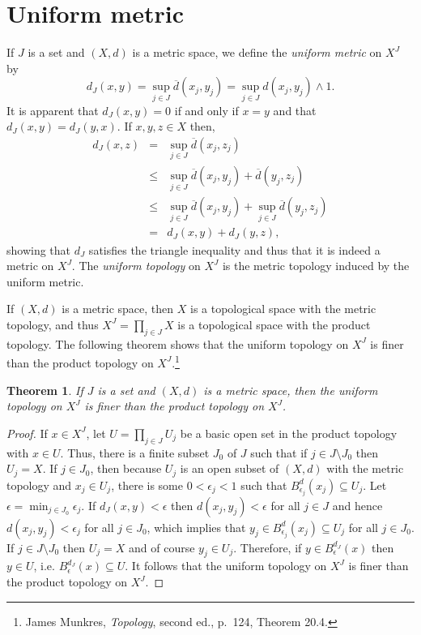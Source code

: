 \documentclass{article}
\newtheorem{theorem}{Theorem}
\theoremstyle{definition}
\begin{document}
\section{Uniform metric}
If $J$ is a set and $(X,d)$ is a metric space, we define the {\em uniform metric} on $X^J$ by 
\[
d_J(x,y) =\sup_{j \in J} \overline{d}(x_j,y_j) =  \sup_{j \in J} d(x_j,y_j) \wedge 1.
\]
It is apparent that $d_J(x,y)=0$ if and only if $x=y$ and that $d_J(x,y)=d_J(y,x)$. If $x,y,z \in X$
then,
\begin{eqnarray*}
d_J(x,z)&=&\sup_{j \in J} \overline{d}(x_j,z_j)\\
&\leq&\sup_{j \in J} \overline{d}(x_j,y_j)+\overline{d}(y_j,z_j)\\
&\leq&\sup_{j \in J} \overline{d}(x_j,y_j) + \sup_{j \in J} \overline{d}(y_j,z_j)\\
&=&d_J(x,y)+d_J(y,z),
\end{eqnarray*}
showing that $d_J$ satisfies the triangle inequality and thus that it is indeed a metric on $X^J$.
The {\em uniform topology} on $X^J$ is the metric topology induced by the uniform metric.



If $(X,d)$ is a metric space, then $X$ is a topological space with the metric topology, and  thus 
$X^J=\prod_{j \in J} X$ is a topological space with the product topology. The following theorem
shows that the uniform topology on $X^J$ is finer than the product topology on $X^J$.\footnote{James
Munkres, {\em Topology}, second ed., p.~124, Theorem 20.4.}

\begin{theorem}
If $J$ is a set and $(X,d)$ is a metric space, then the uniform topology on $X^J$  is finer than
the product topology on $X^J$.
\label{finer}
\end{theorem}
\begin{proof}
If $x \in X^J$, let $U=\prod_{j \in J} U_j$ be a basic open set in the product topology with $x \in U$. Thus, there is a finite 
subset $J_0$ of $J$ such that if $j \in J \setminus J_0$ then $U_j = X$.
If $j \in J_0$, then because $U_j$ is an open subset of $(X,d)$ with the metric topology and $x_j \in U_j$,
there is some $0<\epsilon_j<1$ such that $B^d_{\epsilon_j}(x_j) \subseteq U_j$. Let $\epsilon=\min_{j \in J_0} \epsilon_j$.
If $d_J(x,y)<\epsilon$ then $d(x_j,y_j)<\epsilon$ for all $j \in J$ and hence $d(x_j,y_j)<\epsilon_j$ for all
$j \in J_0$, which implies that $y_j \in B^d_{\epsilon_j}(x_j) \subseteq U_j$ for all $j \in J_0$. If $j \in J \setminus J_0$ then $U_j=X$ and 
of course
$y_j \in U_j$. Therefore, if $y \in B_\epsilon^{d_J}(x)$ then $y \in U$, i.e.
$B_\epsilon^{d_J}(x) \subseteq U$. It follows  that the uniform topology on $X^J$
is finer than the product topology on $X^J$.
\end{proof}
\end{document}
